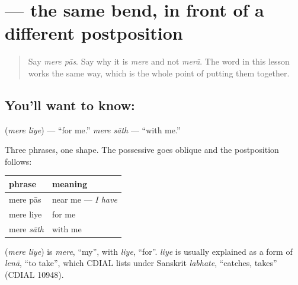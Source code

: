 \section[\texorpdfstring{\hi{मेरे} \hi{लिए} (mere liye)}{मेरे लिए (mere liye)}]{  — the same bend, in front of a different postposition}

\label{lesson:HI-C84-mere-liye}



\begin{quote}
Say \emph{mere pās}. Say why it is \emph{mere} and not \emph{merā}. The word in this lesson works the same way, which is the whole point of putting them together.
\end{quote}

\subsection*{You'll want to know:  }
\textbf{ } (\emph{mere liye}) — \textquotedblleft{}for me.\textquotedblright{} \emph{mere sāth} — \textquotedblleft{}with me.\textquotedblright{}

Three phrases, one shape. The possessive goes oblique and the postposition follows:

\noindent
\begin{tabularx}{\linewidth}{@{}>{\raggedright\arraybackslash}X>{\raggedright\arraybackslash}X@{}}
\toprule
\textbf{phrase} & \textbf{meaning} \\
\midrule
mere pās & near me — \emph{I have} \\
mere liye & for me \\
mere \emph{sāth} & with me \\
\bottomrule
\end{tabularx}

\begin{cousinweb}
\textbf{ } (\emph{mere liye}) is \emph{mere}, \textquotedblleft{}my\textquotedblright{}, with \emph{liye}, \textquotedblleft{}for\textquotedblright{}. \emph{liye} is usually explained as a form of \emph{lenā}, \textquotedblleft{}to take\textquotedblright{}, which CDIAL lists under Sanskrit \emph{labhate}, \textquotedblleft{}catches, takes\textquotedblright{} (CDIAL 10948).
\end{cousinweb}

